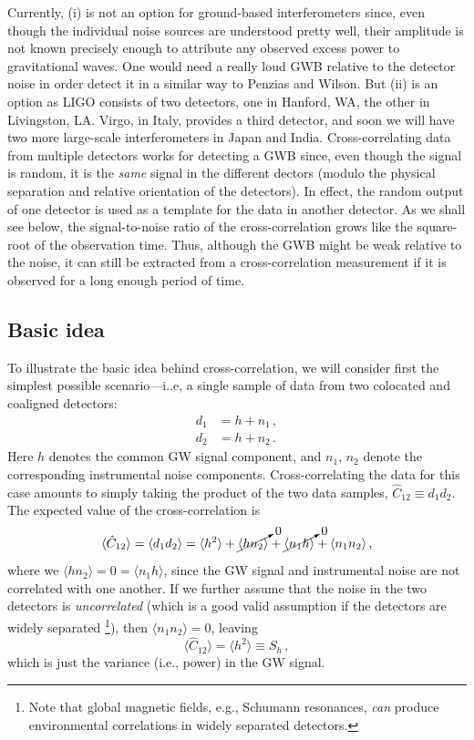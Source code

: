 \documentclass[11pt]{article}
\numberwithin{equation}{section}
\def\be{\begin{equation}}
\def\ee{\end{equation}}
\begin{document}
Currently, (i) is not an option for ground-based 
interferometers since, even though the individual 
noise sources 
are understood pretty well, their amplitude is not 
known precisely enough to attribute any observed 
excess power to gravitational waves.
One would need a really loud GWB relative to the
detector noise in order detect it in a similar way
to Penzias and Wilson.
But (ii) is an option as LIGO consists of two 
detectors, one in Hanford, WA, the other in Livingston, LA.
Virgo, in Italy, provides a third detector, 
and soon we will have two more large-scale 
interferometers in Japan and India.
Cross-correlating data from multiple detectors works
for detecting a GWB since, even though the signal is 
random, it is the {\em same} signal in the different 
dectors (modulo the physical separation and relative
orientation of the detectors).
In effect, the random output of one detector is
used as a template for the data in another detector.
As we shall see below, the signal-to-noise ratio of 
the cross-correlation grows like the square-root of 
the observation time.
Thus, although the GWB might be weak 
relative to the noise, it can still be extracted from 
a cross-correlation measurement if it is observed
for a long enough period of time.

\subsection{Basic idea}
\label{s:basic_idea}

To illustrate the basic idea behind cross-correlation,
we will consider first the simplest possible scenario---i..e,
a single sample of data from two colocated and coaligned
detectors:
%
\be
\begin{aligned}
d_1 &= h + n_1\,,
\\
d_2 &= h + n_2\,.
\end{aligned}
\ee
%
Here $h$ denotes the common GW signal component, 
and $n_1$, $n_2$ denote the corresponding instrumental
noise components.
Cross-correlating the data for this case amounts to 
simply taking the product of the two data 
samples, $\hat C_{12}\equiv d_1 d_2$.
The expected value of the cross-correlation is
%
\be
\langle \hat C_{12}\rangle
=\langle d_1 d_2\rangle
= \langle h^2\rangle + \cancelto{0}{\langle h n_2\rangle} 
+ \cancelto{0}{\langle n_1 h\rangle}
+ \langle n_1 n_2\rangle\,,
\ee
%
where we $\langle h n_2\rangle = 0 = \langle n_1 h\rangle$,
since the GW signal and instrumental noise are not correlated
with one another.
If we further assume that the noise in the two detectors
is {\em uncorrelated} (which is a good valid assumption 
if the detectors are widely separated%
\footnote{Note that global magnetic fields, e.g., Schumann 
resonances, {\em can} produce environmental correlations in 
widely separated detectors.}), then $\langle n_1 n_2\rangle =0$,
leaving
%
\be
\langle \hat C_{12}\rangle = \langle h^2\rangle\equiv S_h\,,
\ee
which is just the variance (i.e., power) in the GW signal.
\end{document}
